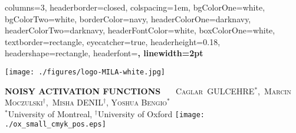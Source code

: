 \documentclass[potrait,a0paper,fontscale=0.285,final]{baposter} %
\begin{document}
\begin{poster}
{
columns=3,
headerborder=closed, %
colspacing=1em, %
bgColorOne=white, %
bgColorTwo=white, %
borderColor=navy, %
headerColorOne=darknavy, %
headerColorTwo=darknavy, %
headerFontColor=white, %
boxColorOne=white, %
textborder=rectangle, %
eyecatcher=true, %
headerheight=0.18\textheight, %
headershape=rectangle, %
headerfont=\large\bf\textsc, %
linewidth=2pt %
}
%
{
\begin{minipage}[b]{0.0965\linewidth}
    \texttt{[image: ./figures/logo-MILA-white.jpg]}
\end{minipage}}
{ \fontsize{31pt}{2pt} \bf\textsc{NOISY ACTIVATION FUNCTIONS}\vspace{0.175em}} %
{~~~\textsc{Caglar~GULCEHRE$^\ast$,~Marcin Moczulski$^\dagger$,~Misha DENIL$^\dagger$, Yoshua
    Bengio$^\ast$}
  \\ \vspace{0.5mm}
{ $^\ast$University of Montreal, $^\dagger$University of Oxford} \vspace{-4mm}} %
{\texttt{[image: ./ox\_small\_cmyk\_pos.eps]}} %



\end{poster}
\end{document}

